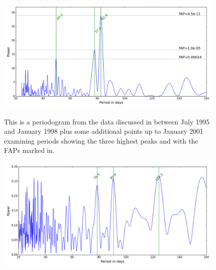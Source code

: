 \begin{figure}[!htbp]
\begin{center}
\includegraphics[scale=0.50]{Figures/hstb4min.png} \\
\end{center}
\caption{This is a periodogram  from the {\hst} data discussed in \citet{benedict98} between July 1995 and
  January 1998 plus some additional points up to January 2001 examining periods showing the three highest peaks and with
  the FAPs marked in. }
\protect\label{fig:hstb4min}
\end{figure}

\begin{figure}[!htbp]
\begin{center}
\includegraphics[scale=0.50]{Figures/hstwinfunc.png} \\
\end{center}
\caption{}
\protect\label{fig:hstwf}
\end{figure}

